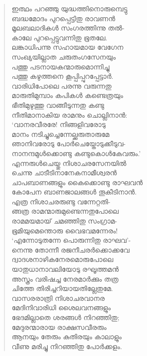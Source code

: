 \begin{verse}
ഇത്ഥം പറഞ്ഞു യുദ്ധത്തിനൊരുമ്പെട്ടു\\
ബദ്ധമോദം പുറപ്പെട്ടിതു രാവണന്‍\\
മൂലബലാദികള്‍ സംഗരത്തിന്നു തല്‍-\\
കാലേ പുറപ്പെട്ടുവന്നിതു ഭൂതലേ.\\
ലങ്കാധിപന്നു സഹായമായ വേഗേന\\
സംഖ്യയില്ലാത ചരുതംഗസേനയും\\
പത്തു പടനായകന്മാരുമൊന്നിച്ചു\\
പത്തു കഴുത്തനെ കൂപ്പിപ്പുറപ്പേട്ടാര്‍.\\
വാരിധിപോലെ പരന്നു വരുന്നതു\\
മാരുതിമുമ്പാം കപികള്‍ കണ്ടെത്രയും\\
ഭീതിമുഴുത്തു വാങ്ങീടുന്നതു കണ്ടു\\
നീതിമാനാകിയ രാമനും ചൊല്ലിനാന്‍:\\
‘വാനരവീരരേ! നിങ്ങളിവരോടു\\
മാനം നടിച്ചുച്ചെന്നേല്ക്കരുതാരുമേ\\
ഞാനിവരോടു പോര്‍ചെയ്തോടുക്കീടുവ-\\
നാനന്ദമുള്‍ക്കൊണ്ടു കണ്ടുകൊള്‍കേവരും.’\\
എന്നരുള്‍ചെയ്തു നിശാചരസേനയില്‍\\
ചെന്നു ചാടീടിനാനേകനാമീശ്വരന്‍\\
ചാപബാണങ്ങളും കൈക്കൊണ്ടു രാഘവന്‍\\
കോപേന ബാണജാലങ്ങള്‍ തൂകീടിനാന്‍.\\
എത്ര നിശാചരരുണ്ടു വന്നേറ്റതി-\\
ങ്ങത്ര രാമന്മാരുമുണ്ടെന്നതുപോലെ\\
രാമമയമായ് ചമഞ്ഞിതു സംഗ്രാമ-\\
ഭൂമിയുമെന്തൊരു വൈഭവമന്നേരം!\\
‘എന്നോടുതന്നേ പൊരുന്നിതു രാഘവ’-\\
നെന്നു തോന്നീ രജനീചരര്‍ക്കൊക്കവേ\\
ദ്വാദശനാഴികനേരമൊരുപോലെ\\
യാതുധാനാവലിയോടു രഘൂത്തമന്‍\\
അസ്ത്രം വരിഷച്ച നേരമാര്‍ക്കും തത്ര\\
ചിത്തേ തിരിച്ചറിയായതില്ലേതുമേ.\\
വാസരരാത്രി നിശാചരവാനര\\
മേദിനിവാരിധി ശൈലവനങ്ങളും\\
ഭേദമില്ലാതെ ശരങ്ങള്‍ നിറഞ്ഞിതു;\\
മേദുരന്മാരായ രാക്ഷസവീരരും\\
ആനയും തേരും കുതിരയും കാലാളും\\
വീണു മരിച്ചു നിറഞ്ഞിതു പോര്‍ക്കളം.\\

\end{verse}
